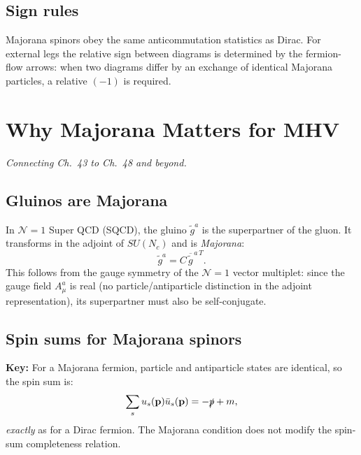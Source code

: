 \documentclass[12pt]{article}
\begin{document}
\subsection{Sign rules}

Majorana spinors obey the same anticommutation statistics as Dirac.  For external
legs the relative sign between diagrams is determined by the fermion-flow arrows:
when two diagrams differ by an exchange of identical Majorana particles, a relative
$(-1)$ is required.

\section{Why Majorana Matters for MHV}

\textit{Connecting Ch.~43 to Ch.~48 and beyond.}

\subsection{Gluinos are Majorana}

In $\mathcal{N}=1$ Super QCD (SQCD), the gluino $\tilde g^a$ is the superpartner
of the gluon.  It transforms in the adjoint of $SU(N_c)$ and is \emph{Majorana}:
\begin{equation}
  \tilde g^a = C\,\overline{\tilde g}^{\,a\,T}.
\end{equation}
This follows from the gauge symmetry of the $\mathcal{N}=1$ vector multiplet:
since the gauge field $A_\mu^a$ is real (no particle/antiparticle distinction in
the adjoint representation), its superpartner must also be self-conjugate.

\subsection{Spin sums for Majorana spinors}

\begin{mdframed}[backgroundcolor=blue!5]
\textbf{Key:} For a Majorana fermion, particle and antiparticle states are
identical, so the spin sum is:
\begin{equation}\label{eq:majorana-spinsum}
  \sum_s u_s(\mathbf{p})\bar u_s(\mathbf{p}) = -\slashed{p} + m,
\end{equation}
\emph{exactly} as for a Dirac fermion.  The Majorana condition does not modify
the spin-sum completeness relation.
\end{mdframed}
\end{document}
